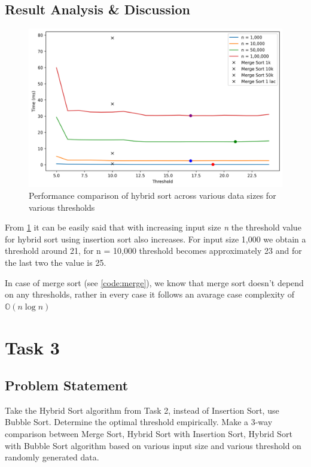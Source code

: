 \subsection{Result Analysis \& Discussion}
\begin{figure}[H]
    \centering
    \includegraphics[width=\textwidth]{img/task2/task2_performance_comparison.png}
    \caption{Performance comparison of hybrid sort across various data sizes for various thresholds}
    \label{fig:task2plot}
\end{figure}
From \cref{fig:task2plot} it can be easily said that with increasing input size \textit{n} the threshold value for hybrid sort using insertion sort also increases.
For input size 1,000 we obtain a threshold around 21, for n = 10,000 threshold becomes approximately 23 and for the last two the value is 25.

In case of merge sort (see \cref{code:merge}), we know that merge sort doesn't depend on any thresholds,
rather in every case it follows an avarage case complexity of 
$\mathbb{O}(n\log n)$
\newpage
\section{Task 3}
\subsection{Problem Statement}
Take the Hybrid Sort algorithm from Task 2, instead of Insertion Sort, use
Bubble Sort. Determine the optimal threshold empirically. Make a 3-way
comparison between Merge Sort, Hybrid Sort with Insertion Sort, Hybrid Sort
with Bubble Sort algorithm based on various input size and various threshold on
randomly generated data.

